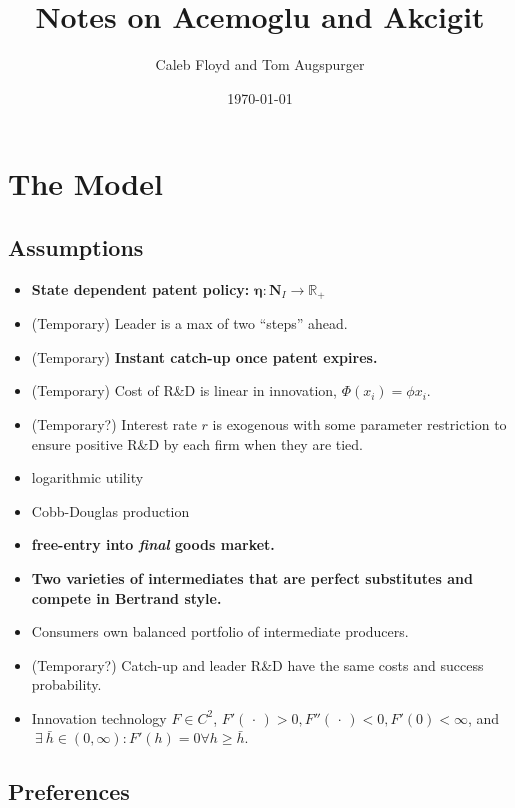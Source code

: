\documentclass[11pt]{article}
\title{Notes on Acemoglu and Akcigit}
\author{Caleb Floyd and Tom Augspurger}
\date{\today}
\begin{document}
\maketitle

\section{The Model}
\label{sec:the_model}

\subsection{Assumptions}
\label{sub:assumptions}

  \begin{itemize}
    \item \textbf{State dependent patent policy:} $\mathbf{\eta} : \mathbf{N}_I \rightarrow \mathbb{R_+}$
    \item (Temporary) Leader is a max of two ``steps'' ahead.
    \item (Temporary) \textbf{Instant catch-up once patent expires.}
    \item (Temporary) Cost of R\&D is linear in innovation, $\Phi(x_i) = \phi x_i$.
    \item (Temporary?) Interest rate $r$ is exogenous with some parameter restriction to ensure positive R\&D by each firm when they are tied.
    \item logarithmic utility
    \item Cobb-Douglas production
    \item \textbf{free-entry into \emph{final} goods market.}
    \item \textbf{Two varieties of intermediates that are perfect substitutes and compete in Bertrand style.}
    \item Consumers own balanced portfolio of intermediate producers.
    \item (Temporary?) Catch-up and leader R\&D have the same costs and success probability.
    \item Innovation technology $F \in C^2$, $F'(\,\cdot\,) > 0, F''(\,\cdot\,) < 0, F'(0) < \infty$, and $\ \exists\ \bar{h} \in (0, \infty) : F'(h) = 0 \forall h \geq \bar{h}$.
  \end{itemize}

\subsection{Preferences}
\label{sub:preferences}
\end{document}
